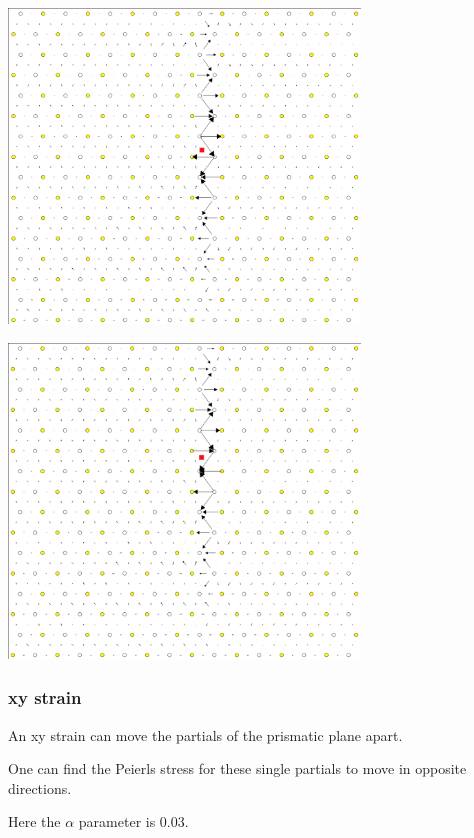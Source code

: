 \documentclass[11pt]{article}
\begin{document}
\begin{center}
\includegraphics[width=0.7\textwidth]{Images/final_model_peierls_xz_initial.png}
\end{center}
\begin{center}
\includegraphics[width=0.7\textwidth]{Images/final_model_peierls_xz_final_0.0012.png}
\end{center}




\subsubsection{xy strain}
\label{sec:org5f22e25}

An xy strain can move the partials of the prismatic plane apart. 

One can find the Peierls stress for these single partials to move
in opposite directions.

Here the \(\alpha\) parameter is 0.03. 
\end{document}
